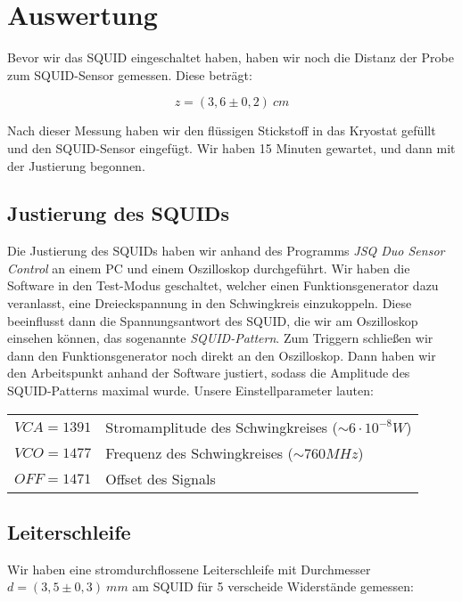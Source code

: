 \section{Auswertung}

Bevor wir das SQUID eingeschaltet haben, haben wir noch die Distanz der Probe zum SQUID-Sensor gemessen. Diese beträgt:

$$z = (3,6 \pm 0,2)\ cm$$

Nach dieser Messung haben wir den flüssigen Stickstoff in das Kryostat gefüllt und den SQUID-Sensor eingefügt. Wir haben 15 Minuten gewartet, und dann mit der Justierung begonnen.

\subsection{Justierung des SQUIDs}

Die Justierung des SQUIDs haben wir anhand des Programms \emph{JSQ Duo Sensor Control} an einem PC und einem Oszilloskop durchgeführt. Wir haben die Software in den Test-Modus geschaltet, welcher einen Funktionsgenerator dazu veranlasst, eine Dreieckspannung in den Schwingkreis einzukoppeln. Diese beeinflusst dann die Spannungsantwort des SQUID, die wir am Oszilloskop einsehen können, das sogenannte \emph{SQUID-Pattern}. Zum Triggern schließen wir dann den Funktionsgenerator noch direkt an den Oszilloskop.  Dann haben wir den Arbeitspunkt anhand der Software justiert, sodass die Amplitude des SQUID-Patterns maximal wurde. Unsere Einstellparameter lauten:\\

\centering \begin{tabular}[H]{l l}
	$VCA = 1391$ & Stromamplitude des Schwingkreises ($\sim 6\cdot 10^{-8} W$)\\
	$VCO = 1477$ & Frequenz des Schwingkreises ($\sim 760 MHz$)\\
	$OFF = 1471$  & Offset des Signals
\end{tabular}


\subsection{Leiterschleife}

Wir haben eine stromdurchflossene Leiterschleife mit Durchmesser $d = (3,5 \pm 0,3)\ mm$ am SQUID für 5 verscheide Widerstände gemessen:\\


